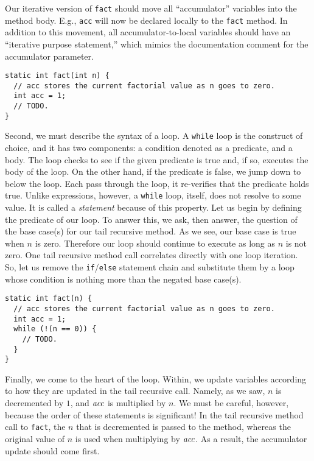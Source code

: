 Our iterative version of \texttt{fact} should move all ``accumulator'' variables into the method body. E.g., \texttt{acc} will now be declared locally to the \texttt{fact} method. In addition to this movement, all accumulator-to-local variables should have an ``iterative purpose statement,'' which mimics the documentation comment for the accumulator parameter.

\enlargethispage{-2\baselineskip}
\begin{lstlisting}[language=MyJava]
static int fact(int n) {
  // acc stores the current factorial value as n goes to zero.
  int acc = 1;
  // TODO.
}
\end{lstlisting}

Second, we must describe the syntax of a loop. A \texttt{while} loop is the construct of choice, and it has two components: a condition denoted as a predicate, and a body. The loop checks to see if the given predicate is true and, if so, executes the body of the loop. On the other hand, if the predicate is false, we jump down to below the loop. Each pass through the loop, it re-verifies that the predicate holds true. Unlike expressions, however, a \texttt{while} loop, itself, does not resolve to some value. It is called a \emph{statement} because of this property. Let us begin by defining the predicate of our loop. To answer this, we ask, then answer, the question of the base case(s) for our tail recursive method. As we see, our base case is true when $n$ is zero. Therefore our loop should continue to execute as long as $n$ is not zero. One tail recursive method call correlates directly with one loop iteration. So, let us remove the \texttt{if}/\texttt{else} statement chain and substitute them by a loop whose condition is nothing more than the negated base case(s).

\begin{lstlisting}[language=MyJava]
static int fact(n) {
  // acc stores the current factorial value as n goes to zero.
  int acc = 1;
  while (!(n == 0)) {
    // TODO.
  }
}
\end{lstlisting}

Finally, we come to the heart of the loop. Within, we update variables according to how they are updated in the tail recursive call. Namely, as we saw, $n$ is decremented by $1$, and $\emph{acc}$ is multiplied by $n$. We must be careful, however, because the order of these statements is significant! In the tail recursive method call to \texttt{fact}, the $n$ that is decremented is passed to the method, whereas the original value of $n$ is used when multiplying by $\emph{acc}$. As a result, the accumulator update should come first.

